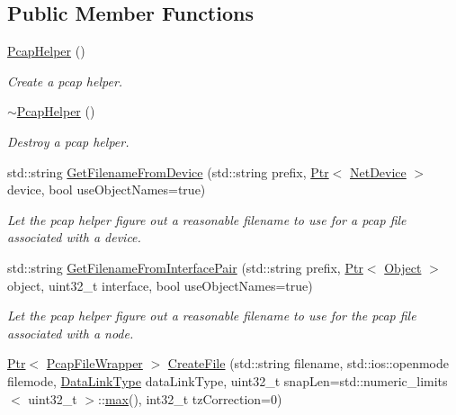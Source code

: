 \subsection*{Public Member Functions}
\begin{DoxyCompactItemize}
\item 
\hyperlink{classns3_1_1PcapHelper_af8ab2dd96c5248be253978c4c3393af3}{Pcap\+Helper} ()
\begin{DoxyCompactList}\small\item\em Create a pcap helper. \end{DoxyCompactList}\item 
\hyperlink{classns3_1_1PcapHelper_ae1a6f0e0210ca9490056499ccaab5d23}{$\sim$\+Pcap\+Helper} ()
\begin{DoxyCompactList}\small\item\em Destroy a pcap helper. \end{DoxyCompactList}\item 
std\+::string \hyperlink{classns3_1_1PcapHelper_a0da71e0938f0074cf08b4167d2e36702}{Get\+Filename\+From\+Device} (std\+::string prefix, \hyperlink{classns3_1_1Ptr}{Ptr}$<$ \hyperlink{classns3_1_1NetDevice}{Net\+Device} $>$ device, bool use\+Object\+Names=true)
\begin{DoxyCompactList}\small\item\em Let the pcap helper figure out a reasonable filename to use for a pcap file associated with a device. \end{DoxyCompactList}\item 
std\+::string \hyperlink{classns3_1_1PcapHelper_a87ec789f731ebfac27deaa9aa3abf8cf}{Get\+Filename\+From\+Interface\+Pair} (std\+::string prefix, \hyperlink{classns3_1_1Ptr}{Ptr}$<$ \hyperlink{classns3_1_1Object}{Object} $>$ object, uint32\+\_\+t interface, bool use\+Object\+Names=true)
\begin{DoxyCompactList}\small\item\em Let the pcap helper figure out a reasonable filename to use for the pcap file associated with a node. \end{DoxyCompactList}\item 
\hyperlink{classns3_1_1Ptr}{Ptr}$<$ \hyperlink{classns3_1_1PcapFileWrapper}{Pcap\+File\+Wrapper} $>$ \hyperlink{classns3_1_1PcapHelper_a216e4a2ee6d533fd71aacab300c1d786}{Create\+File} (std\+::string filename, std\+::ios\+::openmode filemode, \hyperlink{classns3_1_1PcapHelper_a2ee4dad28ddd9a1fe636f51835eaa77f}{Data\+Link\+Type} data\+Link\+Type, uint32\+\_\+t snap\+Len=std\+::numeric\+\_\+limits$<$ uint32\+\_\+t $>$\+::\hyperlink{80211b_8c_affe776513b24d84b39af8ab0930fef7f}{max}(), int32\+\_\+t tz\+Correction=0)

\end{DoxyCompactItemize}

